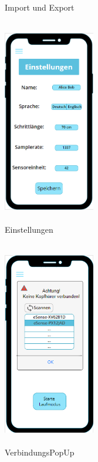 \documentclass[a4paper,12pt]{article}
\begin{document}
\begin{figure}[ht!]
\begin{minipage}{0.4\textwidth}
		\caption{Import und Export}
	\end{minipage}
	\hfill
	\begin{minipage}{0.4\textwidth}
		\includegraphics[width=4cm,height=9cm]{./Benutzeroberflaeche/Settings.png}
		\caption{Einstellungen}
	\end{minipage}
\end{figure}

\clearpage
\begin{figure}[ht!]
	\centering
	\begin{minipage}{0.4\textwidth}
		\includegraphics[width=4cm,height=9cm]{./Benutzeroberflaeche/VerbindungsPopUp.png}
		\caption{VerbindungsPopUp}
		\vspace{30px}
	\end{minipage}
\end{figure}
\end{document}
